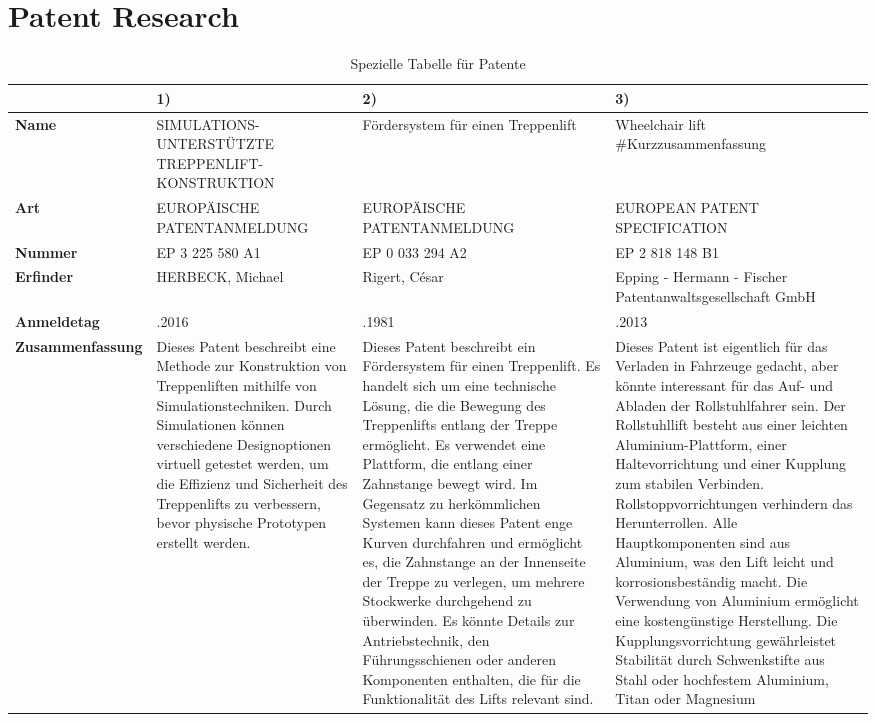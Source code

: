 \documentclass[10pt,a4paper]{article}
\begin{document}
\section{Patent Research}
\begin{table}[h!]
    \centering
    \small %
    \begin{adjustbox}{max width=\textwidth}
    \begin{tabular}{>{\raggedright\arraybackslash}m{3cm} >{\raggedright\arraybackslash}m{3.5cm} >{\raggedright\arraybackslash}m{3.5cm} >{\raggedright\arraybackslash}m{3.5cm}}
        \toprule
        & \textbf{1)} & \textbf{2)} & \textbf{3)} \\
        \midrule
        \textbf{Name} & SIMULATIONS-UNTERSTÜTZTE TREPPENLIFT-KONSTRUKTION & Fördersystem für einen Treppenlift & Wheelchair lift \#Kurzzusammenfassung \\
        \textbf{Art} & EUROPÄISCHE PATENTANMELDUNG & EUROPÄISCHE PATENTANMELDUNG & EUROPEAN PATENT SPECIFICATION \\
        \textbf{Nummer} & EP 3 225 580 A1 & EP 0 033 294 A2 & EP 2 818 148 B1 \\
        \textbf{Erfinder} & HERBECK, Michael & Rigert, César & Epping - Hermann - Fischer Patentanwaltsgesellschaft GmbH \\
        \textbf{Anmeldetag} & 30.03.2016 & 09.01.1981 & 24.06.2013 \\
        \textbf{Zusammenfassung} & Dieses Patent beschreibt eine Methode zur Konstruktion von Treppenliften mithilfe von Simulationstechniken. Durch Simulationen können verschiedene Designoptionen virtuell getestet werden, um die Effizienz und Sicherheit des Treppenlifts zu verbessern, bevor physische Prototypen erstellt werden. & Dieses Patent beschreibt ein Fördersystem für einen Treppenlift. Es handelt sich um eine technische Lösung, die die Bewegung des Treppenlifts entlang der Treppe ermöglicht. Es verwendet eine Plattform, die entlang einer Zahnstange bewegt wird. Im Gegensatz zu herkömmlichen Systemen kann dieses Patent enge Kurven durchfahren und ermöglicht es, die Zahnstange an der Innenseite der Treppe zu verlegen, um mehrere Stockwerke durchgehend zu überwinden. Es könnte Details zur Antriebstechnik, den Führungsschienen oder anderen Komponenten enthalten, die für die Funktionalität des Lifts relevant sind. & Dieses Patent ist eigentlich für das Verladen in Fahrzeuge gedacht, aber könnte interessant für das Auf- und Abladen der Rollstuhlfahrer sein. Der Rollstuhllift besteht aus einer leichten Aluminium-Plattform, einer Haltevorrichtung und einer Kupplung zum stabilen Verbinden. Rollstoppvorrichtungen verhindern das Herunterrollen. Alle Hauptkomponenten sind aus Aluminium, was den Lift leicht und korrosionsbeständig macht. Die Verwendung von Aluminium ermöglicht eine kostengünstige Herstellung. Die Kupplungsvorrichtung gewährleistet Stabilität durch Schwenkstifte aus Stahl oder hochfestem Aluminium, Titan oder Magnesium \\
        \bottomrule
    \end{tabular}
    \end{adjustbox}
    \caption{Spezielle Tabelle für Patente}
    \label{tab:special_table}
\end{table}
\end{document}
